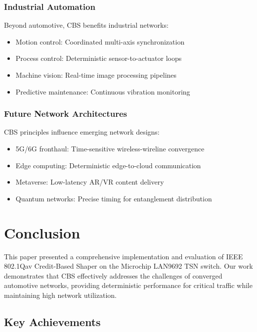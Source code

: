 \documentclass[10pt, journal, compsoc]{IEEEtran}
\begin{document}
\subsubsection{Industrial Automation}

Beyond automotive, CBS benefits industrial networks:
\begin{itemize}
    \item Motion control: Coordinated multi-axis synchronization
    \item Process control: Deterministic sensor-to-actuator loops
    \item Machine vision: Real-time image processing pipelines
    \item Predictive maintenance: Continuous vibration monitoring
\end{itemize}

\subsubsection{Future Network Architectures}

CBS principles influence emerging network designs:
\begin{itemize}
    \item 5G/6G fronthaul: Time-sensitive wireless-wireline convergence
    \item Edge computing: Deterministic edge-to-cloud communication
    \item Metaverse: Low-latency AR/VR content delivery
    \item Quantum networks: Precise timing for entanglement distribution
\end{itemize}

\section{Conclusion}
\label{sec:conclusion}

This paper presented a comprehensive implementation and evaluation of IEEE 802.1Qav Credit-Based Shaper on the Microchip LAN9692 TSN switch. Our work demonstrates that CBS effectively addresses the challenges of converged automotive networks, providing deterministic performance for critical traffic while maintaining high network utilization.

\subsection{Key Achievements}
\end{document}
